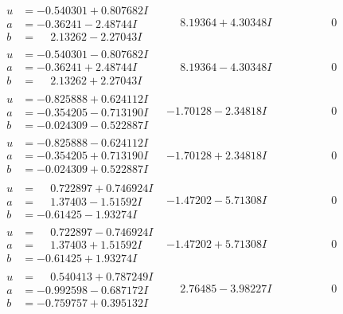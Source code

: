 \documentclass[1p]{elsarticle_modified}
\theoremstyle{definition}
\begin{document}
$$\begin{array}{c|c|c}
\begin{aligned}
u &= -0.540301 + 0.807682 I \\
a &= -0.36241 - 2.48744 I \\
b &= \phantom{-}2.13262 - 2.27043 I\end{aligned}
 & \phantom{-}8.19364 + 4.30348 I & \phantom{-0.000000 } 0 \\ \hline\begin{aligned}
u &= -0.540301 - 0.807682 I \\
a &= -0.36241 + 2.48744 I \\
b &= \phantom{-}2.13262 + 2.27043 I\end{aligned}
 & \phantom{-}8.19364 - 4.30348 I & \phantom{-0.000000 } 0 \\ \hline\begin{aligned}
u &= -0.825888 + 0.624112 I \\
a &= -0.354205 - 0.713190 I \\
b &= -0.024309 - 0.522887 I\end{aligned}
 & -1.70128 - 2.34818 I & \phantom{-0.000000 } 0 \\ \hline\begin{aligned}
u &= -0.825888 - 0.624112 I \\
a &= -0.354205 + 0.713190 I \\
b &= -0.024309 + 0.522887 I\end{aligned}
 & -1.70128 + 2.34818 I & \phantom{-0.000000 } 0 \\ \hline\begin{aligned}
u &= \phantom{-}0.722897 + 0.746924 I \\
a &= \phantom{-}1.37403 - 1.51592 I \\
b &= -0.61425 - 1.93274 I\end{aligned}
 & -1.47202 - 5.71308 I & \phantom{-0.000000 } 0 \\ \hline\begin{aligned}
u &= \phantom{-}0.722897 - 0.746924 I \\
a &= \phantom{-}1.37403 + 1.51592 I \\
b &= -0.61425 + 1.93274 I\end{aligned}
 & -1.47202 + 5.71308 I & \phantom{-0.000000 } 0 \\ \hline\begin{aligned}
u &= \phantom{-}0.540413 + 0.787249 I \\
a &= -0.992598 - 0.687172 I \\
b &= -0.759757 + 0.395132 I\end{aligned}
 & \phantom{-}2.76485 - 3.98227 I & \phantom{-0.000000 } 0 \\ \hline\begin{aligned}

\end{aligned}
\end{array}$$
\end{document}
